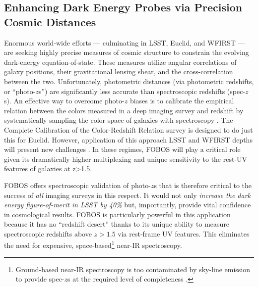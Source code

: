 
\subsection{Enhancing Dark Energy Probes via Precision Cosmic Distances}
\label{sec:cosmology}

Enormous world-wide efforts --- culminating in LSST, Euclid, and
WFIRST --- are seeking highly precise measures of cosmic structure to
constrain the evolving dark-energy equation-of-state. These measures
utilize angular correlations of galaxy positions, their gravitational
lensing shear, and the cross-correlation between the two.
Unfortunately, photometric distances (via photometric redshifts, or
``photo-$z$s'') are significantly less accurate than spectroscopic
redshifts (spec-$z$s). An effective way to overcome photo-$z$ biases
is to calibrate the empirical relation between the colors measured in
a deep imaging survey and redshift by systematically sampling the
color space of galaxies with spectroscopy \citep{masters15}. The
Complete Calibration of the Color-Redshift Relation
\citep[C3R2][]{masters19} survey is designed to do just this for
Euclid. However, application of this approach LSST and WFIRST depths
will present new challenges \citep{hemmati18}. In these regimes,
FOBOS will play a critical role given its dramatically higher
multiplexing and unique sensitivity to the rest-UV features of
galaxies at z>1.5.

FOBOS offers spectroscopic validation of photo-$z$s that is therefore
critical to the success of {\it all} imaging surveys in this respect.
It would not only \emph{increase the dark energy figure-of-merit in
LSST by 40\%} \citep{newman15} but, importantly, provide vital
confidence in cosmological results. FOBOS is particularly powerful in
this application because it has no ``redshift desert'' thanks to its
unique ability to measure spectroscopic redshifts above $z > 1.5$ via
rest-frame UV features. This eliminates the need for expensive,
space-based\footnote{Ground-based near-IR spectroscopy is too
contaminated by sky-line emission to provide spec-$z$s at the
required level of completeness \citep{newman15}.} near-IR
spectroscopy.

\noindent{}

\noindent{}